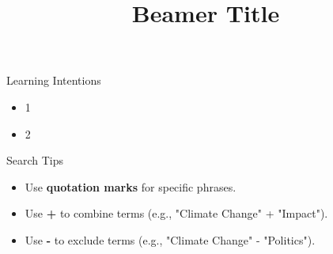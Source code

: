 \documentclass{beamer}
\title{ Beamer Title}
\date{}
\begin{document}
\begin{frame}
  \titlepage
\end{frame}

\begin{frame}{ Learning Intentions}
  \begin{itemize}[<+-| alert@+>]
    \item 1
    \item 2
  \end{itemize}
\end{frame}

\begin{frame}{ Search Tips}
  \begin{itemize}[<+-| alert@+>]
    \item Use \textbf{quotation marks} for specific phrases.
    \item Use \textbf{+} to combine terms (e.g., "Climate Change" + "Impact").
    \item Use \textbf{-} to exclude terms (e.g., "Climate Change" - "Politics").
  \end{itemize}
\end{frame}
\end{document}

